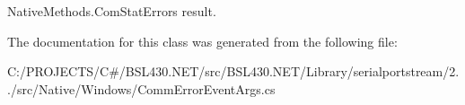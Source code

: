 Native\+Methods.\+Com\+Stat\+Errors result. 



The documentation for this class was generated from the following file\+:\begin{DoxyCompactItemize}
\item 
C\+:/\+P\+R\+O\+J\+E\+C\+T\+S/\+C\#/\+B\+S\+L430.\+N\+E\+T/src/\+B\+S\+L430.\+N\+E\+T/\+Library/serialportstream/2../src/\+Native/\+Windows/Comm\+Error\+Event\+Args.\+cs\end{DoxyCompactItemize}
